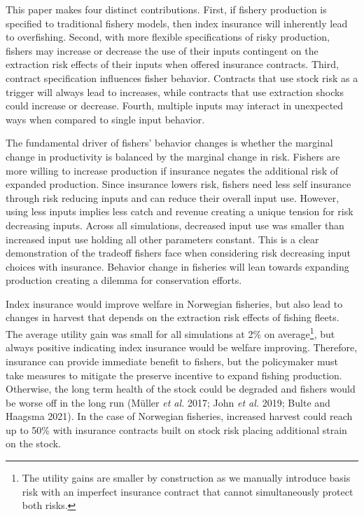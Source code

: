 \documentclass[
  letterpaper,
  DIV=11,
  numbers=noendperiod]{scrartcl}
\theoremstyle{plain}
\theoremstyle{plain}
\theoremstyle{remark}
\begin{document}
This paper makes four distinct contributions. First, if fishery
production is specified to traditional fishery models, then index
insurance will inherently lead to overfishing. Second, with more
flexible specifications of risky production, fishers may increase or
decrease the use of their inputs contingent on the extraction risk
effects of their inputs when offered insurance contracts. Third,
contract specification influences fisher behavior. Contracts that use
stock risk as a trigger will always lead to increases, while contracts
that use extraction shocks could increase or decrease. Fourth, multiple
inputs may interact in unexpected ways when compared to single input
behavior.

The fundamental driver of fishers' behavior changes is whether the
marginal change in productivity is balanced by the marginal change in
risk. Fishers are more willing to increase production if insurance
negates the additional risk of expanded production. Since insurance
lowers risk, fishers need less self insurance through risk reducing
inputs and can reduce their overall input use. However, using less
inputs implies less catch and revenue creating a unique tension for risk
decreasing inputs. Across all simulations, decreased input use was
smaller than increased input use holding all other parameters constant.
This is a clear demonstration of the tradeoff fishers face when
considering risk decreasing input choices with insurance. Behavior
change in fisheries will lean towards expanding production creating a
dilemma for conservation efforts.

Index insurance would improve welfare in Norwegian fisheries, but also
lead to changes in harvest that depends on the extraction risk effects
of fishing fleets. The average utility gain was small for all
simulations at 2\% on average\footnote{The utility gains are smaller by
  construction as we manually introduce basis risk with an imperfect
  insurance contract that cannot simultaneously protect both risks.},
but always positive indicating index insurance would be welfare
improving. Therefore, insurance can provide immediate benefit to
fishers, but the policymaker must take measures to mitigate the preserve
incentive to expand fishing production. Otherwise, the long term health
of the stock could be degraded and fishers would be worse off in the
long run (Müller \emph{et al.} 2017; John \emph{et al.} 2019; Bulte and
Haagsma 2021). In the case of Norwegian fisheries, increased harvest
could reach up to 50\% with insurance contracts built on stock risk
placing additional strain on the stock.
\end{document}

